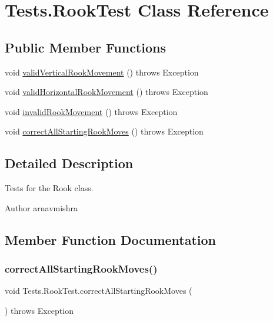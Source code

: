 \hypertarget{class_tests_1_1_rook_test}{}\section{Tests.\+Rook\+Test Class Reference}
\label{class_tests_1_1_rook_test}
\subsection*{Public Member Functions}
\begin{DoxyCompactItemize}
\item 
void \hyperlink{class_tests_1_1_rook_test_a3e0f7b9a6c9660eb2a75405197d261d8}{valid\+Vertical\+Rook\+Movement} ()  throws Exception 
\item 
void \hyperlink{class_tests_1_1_rook_test_a668f3fea9c6f61ff4ef09cb0da938810}{valid\+Horizontal\+Rook\+Movement} ()  throws Exception 
\item 
void \hyperlink{class_tests_1_1_rook_test_a3ecbdd2925b2497d7238d3d5057d527e}{invalid\+Rook\+Movement} ()  throws Exception 
\item 
void \hyperlink{class_tests_1_1_rook_test_a63ceffcd172cdbf213102234cddb8580}{correct\+All\+Starting\+Rook\+Moves} ()  throws Exception 
\end{DoxyCompactItemize}


\subsection{Detailed Description}
Tests for the Rook class. \begin{DoxyAuthor}{Author}
arnavmishra 
\end{DoxyAuthor}


\subsection{Member Function Documentation}
\hypertarget{class_tests_1_1_rook_test_a63ceffcd172cdbf213102234cddb8580}{}\label{class_tests_1_1_rook_test_a63ceffcd172cdbf213102234cddb8580} 
\subsubsection{\texorpdfstring{correct\+All\+Starting\+Rook\+Moves()}{correctAllStartingRookMoves()}}
{\footnotesize\ttfamily void Tests.\+Rook\+Test.\+correct\+All\+Starting\+Rook\+Moves (\begin{DoxyParamCaption}{ }\end{DoxyParamCaption}) throws Exception}

